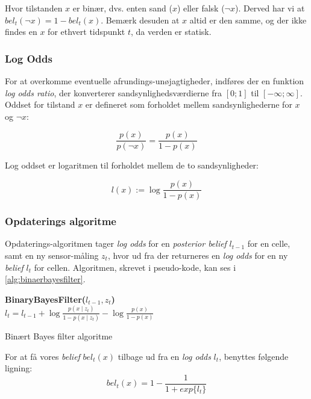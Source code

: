 Hvor tilstanden $x$ er binær, dvs. enten sand ($x$) eller falsk ($\lnot x$).
Derved har vi at $bel_t(\lnot x) = 1 - bel_t(x)$.
Bemærk desuden at $x$ altid er den samme, og der ikke findes en $x$ for ethvert tidspunkt $t$, da verden er statisk.

\subsubsection{Log Odds}
For at overkomme eventuelle afrundings-unøjagtigheder, indføres der en funktion \textit{log odds ratio}, der konverterer sandsynlighedsværdierne fra $[0;1]$ til $[-\infty;\infty]$.
Oddset for tilstand $x$ er defineret som forholdet mellem sandsynlighederne for $x$ og $\lnot x$:

\begin{equation}
\frac{p(x)}{p(\lnot x)} = \frac{p(x)}{1 - p(x)}
\end{equation}

Log oddset er logaritmen til forholdet mellem de to sandsynligheder:

\begin{equation}
l(x) := \log \frac{p(x)}{1 - p(x)}
\end{equation}

\subsubsection{Opdaterings algoritme}
Opdaterings-algoritmen tager \textit{log odds} for en \textit{posterior belief} $l_{t-1}$ for en celle, samt en ny sensor-måling $z_t$, hvor ud fra der returneres en \textit{log odds} for en ny \textit{belief} $l_t$ for cellen.
Algoritmen, skrevet i pseudo-kode, kan ses i \cref{alg:binaerbayesfilter}.

\begin{algorithm}[h]
\textbf{BinaryBayesFilter($l_{t-1}, z_t$)} \\
\Indp $l_t = l_{t-1} + \log \frac{p(x \mid z_t)}{1-p(x \mid z_t)} - \log \frac{p(x)}{1-p(x)}$ \\
\caption{Binært Bayes filter algoritme}
\label{alg:binaerbayesfilter}
\end{algorithm}


For at få vores \textit{belief} $bel_t(x)$ tilbage ud fra en \textit{log odds} $l_t$, benyttes følgende ligning:
\begin{equation}
bel_t(x) = 1 - \frac{1}{1 + exp\{l_t\}}
\end{equation}
